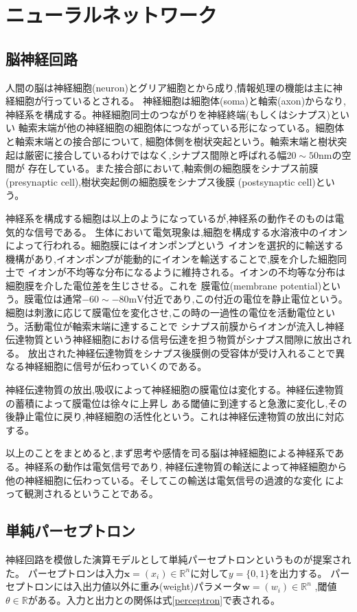 \section{ニューラルネットワーク}
\subsection{脳神経回路}
   人間の脳は神経細胞(neuron)とグリア細胞とから成り,情報処理の機能は主に神経細胞が行っているとされる。
  神経細胞は細胞体(soma)と軸索(axon)からなり,神経系を構成する。神経細胞同士のつながりを神経終端(もしくはシナプス)といい
  軸索末端が他の神経細胞の細胞体につながっている形になっている。細胞体と軸索末端との接合部について,
  細胞体側を樹状突起という。軸索末端と樹状突起は厳密に接合しているわけではなく,シナプス間隙と呼ばれる幅$20\sim 50\mathrm{nm}$の空間が
  存在している。また接合部において,軸索側の細胞膜をシナプス前膜(presynaptic cell),樹状突起側の細胞膜をシナプス後膜
  (postsynaptic cell)という。

   神経系を構成する細胞は以上のようになっているが,神経系の動作そのものは電気的な信号である。
  生体において電気現象は,細胞を構成する水溶液中のイオンによって行われる。細胞膜にはイオンポンプという
  イオンを選択的に輸送する機構があり,イオンポンプが能動的にイオンを輸送することで,膜を介した細胞同士で
  イオンが不均等な分布になるように維持される。イオンの不均等な分布は細胞膜を介した電位差を生じさせる。これを
  膜電位(membrane potential)という。膜電位は通常$-60\sim-80\mathrm{mV}$付近であり,この付近の電位を静止電位という。
  細胞は刺激に応じて膜電位を変化させ,この時の一過性の電位を活動電位という。活動電位が軸索末端に達することで
  シナプス前膜からイオンが流入し神経伝達物質という神経細胞における信号伝達を担う物質がシナプス間隙に放出される。
  放出された神経伝達物質をシナプス後膜側の受容体が受け入れることで異なる神経細胞に信号が伝わっていくのである。

   神経伝達物質の放出,吸収によって神経細胞の膜電位は変化する。神経伝達物質の蓄積によって膜電位は徐々に上昇し
  ある閾値に到達すると急激に変化し,その後静止電位に戻り,神経細胞の活性化という。これは神経伝達物質の放出に対応する。

   以上のことをまとめると,まず思考や感情を司る脳は神経細胞による神経系である。神経系の動作は電気信号であり,
  神経伝達物質の輸送によって神経細胞から他の神経細胞に伝わっている。そしてこの輸送は電気信号の過渡的な変化
  によって観測されるということである。

\subsection{単純パーセプトロン}
  神経回路を模倣した演算モデルとして単純パーセプトロンというものが提案された。
  パーセプトロンは入力$\bm{x}=(x_i) \in \mathbb{R}^n $に対して$y=\{0,1\}$を出力する。
  パーセプトロンには入出力値以外に重み(weight)パラメータ$\bm{w}=(w_i) \in \mathbb{R}^n$
  ,閾値$\theta \in \mathbb{R}$がある。入力と出力との関係は式\ref{perceptron}で表される。
  
